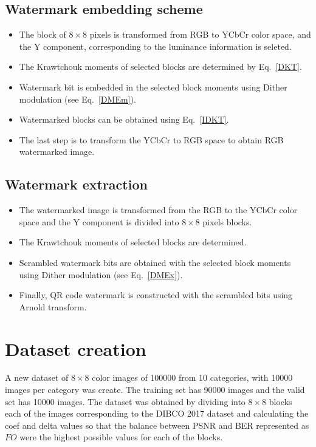 \documentclass[runningheads]{llncs}
\begin{document}
\subsection*{Watermark embedding scheme}
\begin{itemize}
	\item[\checkmark] The block of $8\times 8$ pixels is transformed from RGB to YCbCr color space, and the Y component, corresponding to the luminance information is seleted.
	\item[\checkmark] The Krawtchouk moments of selected blocks are determined by Eq.~\ref{DKT}.
	\item[\checkmark] Watermark bit is embedded in the selected block moments using Dither modulation (see Eq.~\ref{DMEm}).
	\item[\checkmark] Watermarked blocks can be obtained using Eq.~\ref{IDKT}.
	\item[\checkmark] The last step is to transform the YCbCr to RGB space to obtain RGB watermarked image.
\end{itemize}

\subsection*{Watermark extraction}
\begin{itemize}
	\item[\checkmark] The watermarked image is transformed from the RGB to the YCbCr color space and the Y component is divided into $8\times 8$ pixels blocks.
	\item[\checkmark] The Krawtchouk moments of selected blocks are determined.
	\item[\checkmark] Scrambled watermark bits are obtained with the selected block moments using Dither modulation (see Eq.~\ref{DMEx}).
	\item[\checkmark] Finally, QR code watermark is constructed with the scrambled bits using Arnold transform.
\end{itemize}

\section{Dataset creation}

A new dataset of $8\times 8$ color images of 100000 from 10 categories, with 10000 images per category was create. The training set has 90000 images and the valid set has 10000 images. The dataset was obtained by dividing into $8\times 8$ blocks each of the images corresponding to the DIBCO 2017 dataset and calculating the coef and delta values so that the balance between PSNR and BER represented as $FO$ were the highest possible values for each of the blocks.
\end{document}
